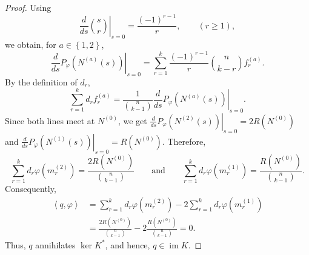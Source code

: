 \documentclass[10pt,a4paper]{amsart}
\begin{document}
\begin{proof}
Using
\[
\left.\frac{d}{ds}\binom{s}{r}\right\rvert_{s=0}=\frac{\left(-1\right)^{r-1}}{r},\qquad (r\ge1),
\]
we obtain, for \(a\in\left\{1,2\right\}\),
\[
\left.\frac{d}{ds}P_\varphi\left(N^{\left(a\right)}\left(s\right)\right)\right\rvert_{s=0}=\sum_{r=1}^k\frac{\left(-1\right)^{r-1}}{r}\binom{n}{k-r}f_r^{\left(a\right)}.
\]
By the definition of \(d_r\),
\[
\sum_{r=1}^kd_rf_r^{\left(a\right)}=\frac{1}{\binom{n}{k-1}}\left.\frac{d}{ds}P_\varphi\left(N^{\left(a\right)}\left(s\right)\right)\right\rvert_{s=0}.
\]
Since both lines meet at \(N^{\left(0\right)}\), we get \(\left.\frac{d}{ds}P_\varphi\left(N^{\left(2\right)}\left(s\right)\right)\right\rvert_{s=0}=2R\left(N^{\left(0\right)}\right)\) and \(\left.\frac{d}{ds}P_\varphi\left(N^{\left(1\right)}\left(s\right)\right)\right\rvert_{s=0}=R\left(N^{\left(0\right)}\right)\). Therefore,
\[
\sum_{r=1}^kd_r\varphi\left(m_r^{\left(2\right)}\right)=\frac{2R\left(N^{\left(0\right)}\right)}{\binom{n}{k-1}}
\qquad \text{and} \qquad
\sum_{r=1}^kd_r\varphi\left(m_r^{\left(1\right)}\right)=\frac{R\left(N^{\left(0\right)}\right)}{\binom{n}{k-1}}.
\]
Consequently,
\[
\begin{aligned}
\left\langle q,\varphi\right\rangle&=\sum_{r=1}^kd_r\varphi\left(m_r^{\left(2\right)}\right)-2\sum_{r=1}^kd_r\varphi\left(m_r^{\left(1\right)}\right)\\
&=\frac{2R\left(N^{\left(0\right)}\right)}{\binom{n}{k-1}}-2\frac{R\left(N^{\left(0\right)}\right)}{\binom{n}{k-1}}=0.
\end{aligned}
\]
Thus, \(q\) annihilates \(\ker K^*\), and hence, \(q\in\operatorname{im}K\).
\end{proof}
\end{document}
